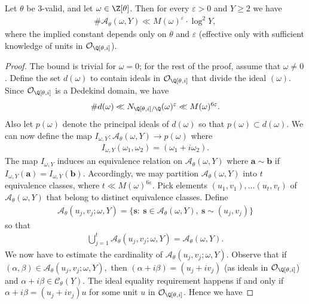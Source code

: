 \documentclass[12pt]{amsart}
\newcommand{\1}{\mathmybb{1}}
\begin{document}
\begin{lem}
\label{AthetaomegaYupperbound}
Let $\theta$ be 3-valid, and let $\omega \in \Z[\theta]$. Then for every $\varepsilon>0$ and $Y \geq 2$ we have
\begin{align*}
\#\mathcal{A}_{\theta}(\omega,Y) \ll M(\omega)^{\varepsilon}\cdot \log^2 Y,
\end{align*}
where the implied constant depends only on $\theta$ and $\varepsilon$ (effective only with sufficient knowledge of units in $\mathcal{O}_{\Q[\theta,i]}$).
\end{lem}
\begin{proof}
The bound is trivial for $\omega = 0$; for the rest of the proof, assume that $\omega \neq 0$.
Define the set $d(\omega)$ to contain ideals in $\mathcal{O}_{\Q[\theta,i]}$ that divide the ideal $(\omega)$. Since $\mathcal{O}_{\Q[\theta,i]}$ is a Dedekind domain, we have 
\begin{align*}
\# d(\omega) \ll N_{\Q[\theta,i]/\Q}(\omega)^{\varepsilon} \ll M(\omega)^{6\varepsilon}.
\end{align*}
Also let $p(\omega)$ denote the principal ideals of $d(\omega)$ so that $p(\omega) \subset d(\omega)$. We can now define the map $I_{\omega,Y} : \mathcal{A}_{\theta}(\omega,Y) \rightarrow p(\omega)$ where
\begin{align*}
I_{\omega,Y}(\omega_{1},\omega_{2}) = (\omega_{1}+i\omega_{2}).
\end{align*}
The map $I_{\omega,Y}$ induces an equivalence relation on $\mathcal{A}_{\theta}(\omega,Y)$ where $\mathbf{a}\sim \mathbf{b}$ if $I_{\omega,Y}(\mathbf{a}) = I_{\omega,Y}(\mathbf{b})$. Accordingly, we may partition $\mathcal{A}_{\theta}(\omega,Y)$ into $t$ equivalence classes, where $t \ll M(\omega)^{6\varepsilon}$. Pick elements $(u_{1},v_{1}),\ldots (u_{t},v_{t})$ of $\mathcal{A}_{\theta}(\omega,Y)$ that belong to distinct equivalence classes. Define
\begin{align*}
\mathcal{A}_{\theta}(u_{j},v_{j};\omega,Y) = \{\mathbf{s}: \  \mathbf{s}\in \mathcal{A}_{\theta}(\omega,Y), \ \mathbf{s}\sim (u_{j},v_{j})\}
\end{align*}
so that 
\begin{align}
\label{tpartitionAthetawY}
\bigcup_{j=1}^{t}\mathcal{A}_{\theta}(u_{j},v_{j};\omega,Y) = \mathcal{A}_{\theta}(\omega,Y).
\end{align}
We now have to estimate the cardinality of $\mathcal{A}_{\theta}(u_{j},v_{j};\omega,Y)$. Observe that if $(\alpha,\beta) \in \mathcal{A}_{\theta}(u_{j},v_{j};\omega,Y),$ then $(\alpha + i\beta) = (u_{j}+iv_{j})$ (as ideals in $\mathcal{O}_{\Q[\theta,i]}$) and $\alpha+i\beta \in \mathcal{C}_{\theta}(Y)$. The ideal equality requirement happens if and only if $\alpha + i \beta = (u_{j}+iv_{j})u$ for some unit $u$ in $\mathcal{O}_{\Q[\theta,i]}$. Hence we have

\end{proof}
\end{document}

